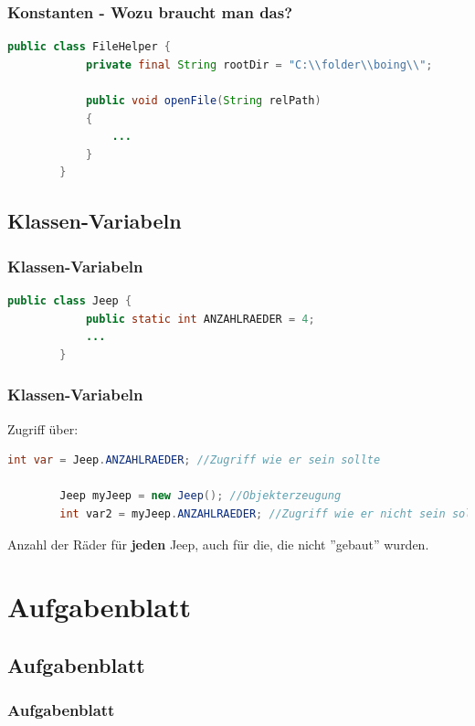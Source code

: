 \documentclass[18pt]{beamer}
\begin{document}

\begin{frame}[fragile]
	\frametitle{Konstanten - Wozu braucht man das?}
	
	\begin{lstlisting}[language=java]
		public class FileHelper {
			private final String rootDir = "C:\\folder\\boing\\";
			
			public void openFile(String relPath)
			{
				...
			}
		}
	\end{lstlisting}
\end{frame}


\subsection{Klassen-Variabeln}
\begin{frame}[fragile]
	\frametitle{Klassen-Variabeln}
	
	\begin{lstlisting}[language=java]
		public class Jeep {
			public static int ANZAHLRAEDER = 4;
			...
		}
	\end{lstlisting}
\end{frame}
	
\begin{frame}[fragile]
	\frametitle{Klassen-Variabeln}
	Zugriff über:
	\begin{lstlisting}[language=java]
		int var = Jeep.ANZAHLRAEDER; //Zugriff wie er sein sollte
		
		Jeep myJeep = new Jeep(); //Objekterzeugung
		int var2 = myJeep.ANZAHLRAEDER; //Zugriff wie er nicht sein sollte, aber geht.
	\end{lstlisting}
	
	
	Anzahl der Räder für \textbf{jeden} Jeep, auch für die, die nicht ''gebaut'' wurden.
\end{frame}


\section{Aufgabenblatt}
\subsection{Aufgabenblatt}
\begin{frame}
	\frametitle{Aufgabenblatt}
\end{frame}
\end{document}
